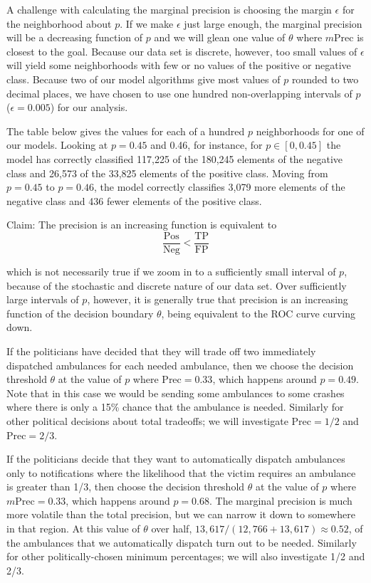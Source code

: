 A challenge with calculating the marginal precision is choosing the margin $\epsilon$ for the neighborhood about $p$.  If we make $\epsilon$ just large enough, the marginal precision will be a decreasing function of $p$ and we will glean one value of $\theta$ where $m\text{Prec}$ is closest to the goal.  Because our data set is discrete, however, too small values of $\epsilon$ will yield some neighborhoods with few or no values of the positive or negative class.  Because two of our model algorithms give most values of $p$ rounded to two decimal places, we have chosen to use one hundred non-overlapping intervals of $p$ ($\epsilon = 0.005$) for our analysis.

The table below gives the values for each of a hundred $p$ neighborhoods for one of our models.  Looking at $p=0.45$ and 0.46, for instance, for $p \in [0, 0.45]$ the model has correctly classified 117,225 of the 180,245 elements of the negative class and 26,573 of the 33,825 elements of the positive class.  Moving from $p=0.45$ to $p=0.46$, the model correctly classifies 3,079 more elements of the negative class and 436 fewer elements of the positive class.  

Claim:  The precision is an increasing function is equivalent to $$\frac{\text{Pos}}{\text{Neg}} 
< \frac{\text{TP}}{\text{FP}}$$

which is not necessarily true if we zoom in to a sufficiently small interval of $p$, because of the stochastic and discrete nature of our data set.  Over sufficiently large intervals of $p$, however, it is generally true that precision is an increasing function of the decision boundary $\theta$, being equivalent to the ROC curve curving down.  

If the politicians have decided that they will trade off two immediately dispatched ambulances for each needed ambulance, then we choose the decision threshold $\theta$ at the value of $p$ where $\text{Prec} = 0.33$, which happens around $p = 0.49$.  Note that in this case we would be sending some ambulances to some crashes where there is only a 15\% chance that the ambulance is needed.  Similarly for other political decisions about total tradeoffs; we will investigate $\text{Prec} = 1/2$ and $\text{Prec} = 2/3$. 

If the politicians decide that they want to automatically dispatch ambulances only to notifications where the likelihood that the victim requires an ambulance is greater than 1/3, then choose the decision threshold $\theta$ at the value of $p$ where $m\text{Prec} = 0.33$, which happens around $p = 0.68$.  The marginal precision is much more volatile than the total precision, but we can narrow it down to somewhere in that region.  At this value of $\theta$ over half, $13,617/(12,766 + 13,617) \approx 0.52$, of the ambulances that we automatically dispatch turn out to be needed.  Similarly for other politically-chosen minimum percentages; we will also investigate 1/2 and 2/3.  

